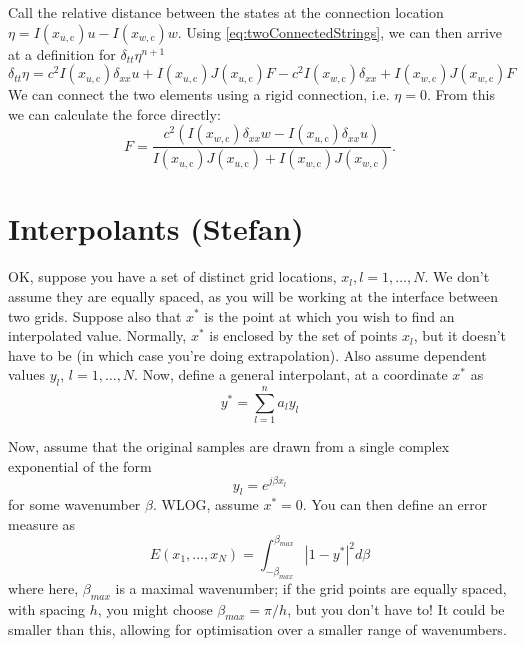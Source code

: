 \documentclass[dvipsnames]{article}
\begin{document}
Call the relative distance between the states at the connection location $\eta = I(x_{u,\text{c}})u - I(x_{w,\text{c}})w$. Using \eqref{eq:twoConnectedStrings}, we can then arrive at a definition for $\delta_{tt}\eta^{n+1}$
\begin{equation}
    \delta_{tt}\eta = c^2I(x_{u,\text{c}})\delta_{xx}u +  I(x_{u,\text{c}})J(x_{u,\text{c}})F - c^2 I(x_{w,\text{c}})\delta_{xx} + I(x_{w,\text{c}})J(x_{w,\text{c}})F
\end{equation}
We can connect the two elements using a rigid connection, i.e. $\eta = 0$. From this we can calculate the force directly:
\begin{equation}
    F = \frac{c^2(I(x_{w,\text{c}})\delta_{xx}w-I(x_{u,\text{c}})\delta_{xx}u)}{I(x_{u,\text{c}})J(x_{u,\text{c}}) + I(x_{w,\text{c}})J(x_{w,\text{c}})}.
\end{equation}

\section{Interpolants (Stefan)}

OK, suppose you have a set of distinct grid locations, $x_{l}, l=1,\hdots,N$. We don't assume they are equally spaced, as you will be working at the interface between two grids. Suppose also that $x^{*}$ is the point at which you wish to find an interpolated value. Normally, $x^{*}$ is enclosed by the set of points $x_{l}$, but it doesn't have to be (in which case you're doing extrapolation). Also assume dependent values $y_{l}$, $l=1,\hdots,N$. Now, define a general interpolant, at a coordinate $x^{*}$ as
\begin{equation}
    y^{*} = \sum_{l=1}^{n}a_{l}y_{l}
\end{equation}

Now, assume that the original samples are drawn from a single complex exponential of the form
\begin{equation}
    y_{l} = e^{j\beta x_{l}}
\end{equation}
for some wavenumber $\beta$. WLOG, assume $x^{*} = 0$. You can then define an error measure as
\begin{equation}
    E(x_{1},\hdots,x_{N}) = \int_{-\beta_{max}}^{\beta_{max}}|1-y^{*}|^2 d\beta
\end{equation}
where here, $\beta_{max}$ is a maximal wavenumber; if the grid points are equally spaced, with spacing $h$, you might choose $\beta_{max} = \pi/h$, but you don't have to! It could be smaller than this, allowing for optimisation over a smaller range of wavenumbers. 
\end{document}
